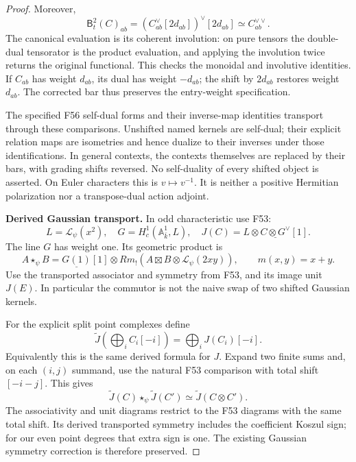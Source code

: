 \documentclass[11pt,a4paper]{article}
\newcommand{\fid}[1]{\textsf{#1}}\newcommand{\gate}[1]{\textsf{#1}}
\theoremstyle{named}\newtheorem{finding}{Finding}[section]
\theoremstyle{definition}\newtheorem{definition}[finding]{Definition}
\theoremstyle{remark}\newtheorem{remark}[finding]{Remark}
\begin{document}
\begin{proof}
Moreover,
\[
 \mathsf B_t^2(C)_{ab}
   =(C_{ab}^\vee[2d_{ab}])^\vee[2d_{ab}]
   \simeq C_{ab}^{\vee\vee}.
\]
The canonical evaluation is its coherent involution:
on pure tensors the double-dual tensorator is the
product evaluation, and applying the involution twice
returns the original functional. This checks the
monoidal and involutive identities.
If \(C_{ab}\) has weight \(d_{ab}\), its dual has
weight \(-d_{ab}\); the shift by \(2d_{ab}\)
restores weight \(d_{ab}\). The corrected bar thus
preserves the entry-weight specification.

The specified F56 self-dual forms and their inverse-map
identities transport through these comparisons.
Unshifted named kernels are self-dual; their explicit
relation maps are isometries and hence dualize to
their inverses under those identifications.
In general contexts, the contexts themselves are
replaced by their bars, with grading shifts reversed.
No self-duality of every shifted object is asserted.
On Euler characters this is \(v\mapsto v^{-1}\).
It is neither a positive Hermitian polarization nor
a transpose-dual action adjoint.

\par\smallskip\noindent\textbf{Derived Gaussian transport.}\quad
In odd characteristic use \fid{F53}:
\[
 L=\mathcal L_\psi(x^2),\quad
 G=H_c^1(\mathbb A^1_{\bar k},L),\quad
 J(C)=L\otimes\underline{C\otimes G^\vee}[1].
\]
The line \(G\) has weight one. Its geometric product is
\[
 A\star_\psi B=
 \underline{G(1)}[1]\otimes
 Rm_!\left(A\boxtimes B\otimes\mathcal L_\psi(2xy)\right),
 \qquad m(x,y)=x+y.
\]
Use the transported associator and symmetry from
\fid{F53}, and its image unit \(J(E)\).
In particular the commutor is not the naive swap of
two shifted Gaussian kernels.

For the explicit split point complexes define
\[
 \widetilde J\left(\bigoplus_i C_i[-i]\right)
       =\bigoplus_i J(C_i)[-i].
\]
Equivalently this is the same derived formula for \(J\).
Expand two finite sums and, on each \((i,j)\) summand,
use the natural F53 comparison with total shift
\([-i-j]\). This gives
\[
 \widetilde J(C)\star_\psi\widetilde J(C')
       \simeq\widetilde J(C\otimes C').
\]
The associativity and unit diagrams restrict to the
F53 diagrams with the same total shift.
Its derived transported symmetry includes the
coefficient Koszul sign; for our even point degrees
that extra sign is one. The existing Gaussian
symmetry correction is therefore preserved.


\end{proof}
\end{document}

